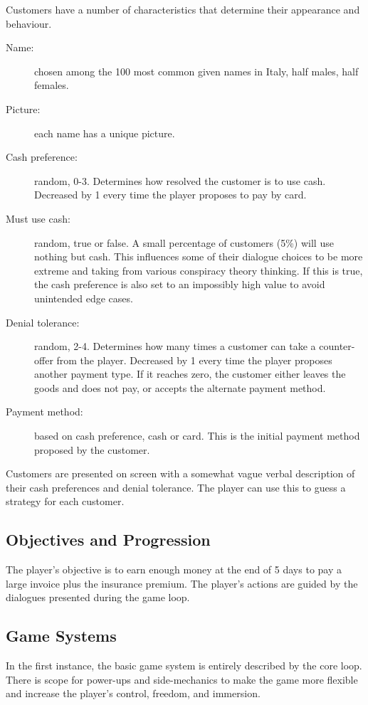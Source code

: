 \documentclass[a4paper,11pt]{article}
\begin{document}
Customers have a number of characteristics that determine their appearance and behaviour.
\begin{description}
  \item[Name:] chosen among the 100 most common given names in Italy, half males, half females.
  \item[Picture:] each name has a unique picture.
  \item[Cash preference:] random, 0-3. Determines how resolved the customer is to use cash. Decreased by 1 every time the player proposes to pay by card.
  \item[Must use cash:] random, true or false. A small percentage of customers (5\%) will use nothing but cash. This influences some of their dialogue choices to be more extreme and taking from various conspiracy theory thinking. If this is true, the cash preference is also set to an impossibly high value to avoid unintended edge cases.
  \item[Denial tolerance:] random, 2-4. Determines how many times a customer can take a counter-offer from the player. Decreased by 1 every time the player proposes another payment type. If it reaches zero, the customer either leaves the goods and does not pay, or accepts the alternate payment method.
  \item[Payment method:] based on cash preference, cash or card. This is the initial payment method proposed by the customer.
\end{description}

Customers are presented on screen with a somewhat vague verbal description of their cash preferences and denial tolerance. The player can use this to guess a strategy for each customer.

\subsection{Objectives and Progression}\label{objectives-and-progression}
The player's objective is to earn enough money at the end of 5 days to pay a large invoice plus the insurance premium. The player's actions are guided by the dialogues presented during the game loop.

\subsection{Game Systems}\label{game-systems}
In the first instance, the basic game system is entirely described by the core loop. There is scope for power-ups and side-mechanics to make the game more flexible and increase the player's control, freedom, and immersion.
\end{document}
